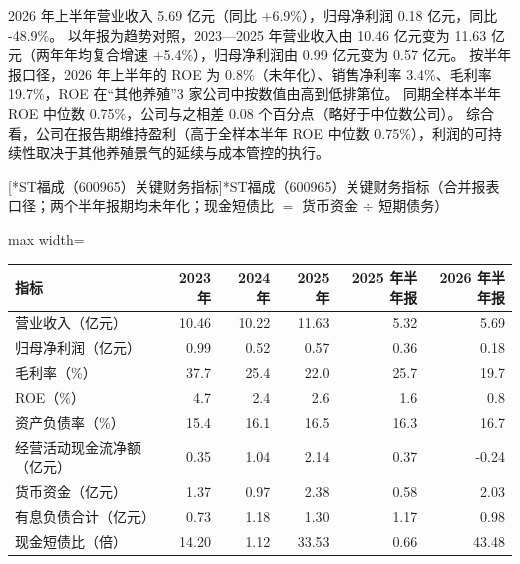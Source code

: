  2026 年上半年营业收入 5.69 亿元（同比 +6.9\%），归母净利润 0.18 亿元，同比 -48.9\%。 以年报为趋势对照，2023---2025 年营业收入由 10.46 亿元变为 11.63 亿元（两年年均复合增速 +5.4\%），归母净利润由 0.99 亿元变为 0.57 亿元。 按半年报口径，2026 年上半年的 ROE 为 0.8\%（未年化）、销售净利率 3.4\%、毛利率 19.7\%，ROE 在“其他养殖”3 家公司中按数值由高到低排第位。 同期全样本半年 ROE 中位数 0.75\%，公司与之相差 0.08 个百分点（略好于中位数公司）。 综合看，公司在报告期维持盈利（高于全样本半年 ROE 中位数 0.75\%），利润的可持续性取决于其他养殖景气的延续与成本管控的执行。

\begin{center}\small\setlength{\tabcolsep}{3.4pt}
[*ST福成（600965）关键财务指标]{*ST福成（600965）关键财务指标（合并报表口径；两个半年报期均未年化；现金短债比 $=$ 货币资金 $\div$ 短期债务）}
\begin{adjustbox}{max width=\textwidth}
\begin{tabular}{@{}lrrrrr@{}}
\toprule
指标 & 2023 年 & 2024 年 & 2025 年 & 2025 年半年报 & 2026 年半年报 \\
\midrule
营业收入（亿元） & 10.46 & 10.22 & 11.63 & 5.32 & 5.69 \\
归母净利润（亿元） & 0.99 & 0.52 & 0.57 & 0.36 & 0.18 \\
毛利率（\%） & 37.7 & 25.4 & 22.0 & 25.7 & 19.7 \\
ROE（\%） & 4.7 & 2.4 & 2.6 & 1.6 & 0.8 \\
资产负债率（\%） & 15.4 & 16.1 & 16.5 & 16.3 & 16.7 \\
经营活动现金流净额（亿元） & 0.35 & 1.04 & 2.14 & 0.37 & -0.24 \\
货币资金（亿元） & 1.37 & 0.97 & 2.38 & 0.58 & 2.03 \\
有息负债合计（亿元） & 0.73 & 1.18 & 1.30 & 1.17 & 0.98 \\
现金短债比（倍） & 14.20 & 1.12 & 33.53 & 0.66 & 43.48 \\
\bottomrule
\end{tabular}
\end{adjustbox}
\end{center}

